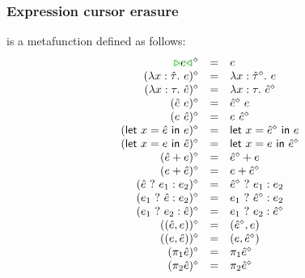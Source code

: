 \documentclass[formalism.tex]{subfiles}
\begin{document}
\subsubsection{Expression cursor erasure}
\judgbox{\ensuremath{\cursorErase{\ZMV}}} is a metafunction defined as follows:
%
\[\begin{array}{rcl}
  \cursorErasesToRow{\ZCursor{\EMV}}{\EMV} \\
  \cursorErasesToRow{(\ZLamT{x}{\ZTMV}{\EMV})}{\ELam{x}{\cursorErase{\ZTMV}}{\EMV}} \\
  \cursorErasesToRow{(\ZLamE{x}{\TMV}{\ZMV})}{\ELam{x}{\TMV}{\cursorErase{\ZMV}}} \\
  \cursorErasesToRow{(\ZApL{\ZMV}{\EMV})}{\EAp{\cursorErase{\ZMV}}{\EMV}} \\
  \cursorErasesToRow{(\ZApR{\EMV}{\ZMV})}{\EAp{\EMV}{\cursorErase{\ZMV}}} \\
  \cursorErasesToRow{(\ZLetL{x}{\ZMV}{\EMV})}{\ELet{x}{\cursorErase{\ZMV}}{\EMV}} \\
  \cursorErasesToRow{(\ZLetR{x}{\EMV}{\ZMV})}{\ELet{x}{\EMV}{\cursorErase{\ZMV}}} \\
  \cursorErasesToRow{(\ZPlusL{\ZMV}{\EMV})}{\EPlus{\cursorErase{\ZMV}}{\EMV}} \\
  \cursorErasesToRow{(\ZPlusR{\EMV}{\ZMV})}{\EPlus{\EMV}{\cursorErase{\ZMV}}} \\
  \cursorErasesToRow{(\ZIfC{\ZMV}{\EMV_1}{\EMV_2})}{\EIf{\cursorErase{\ZMV}}{\EMV_1}{\EMV_2}} \\
  \cursorErasesToRow{(\ZIfL{\EMV_1}{\ZMV}{\EMV_2})}{\EIf{\EMV_1}{\cursorErase{\ZMV}}{\EMV_2}} \\
  \cursorErasesToRow{(\ZIfL{\EMV_1}{\EMV_2}{\ZMV})}{\EIf{\EMV_1}{\EMV_2}{\cursorErase{\ZMV}}} \\
  \cursorErasesToRow{(\ZPairL{\ZMV}{\EMV})}{\EPair{\cursorErase{\ZMV}}{\EMV}} \\
  \cursorErasesToRow{(\ZPairR{\EMV}{\ZMV})}{\EPair{\EMV}{\cursorErase{\ZMV}}} \\
  \cursorErasesToRow{(\ZProjL{\ZMV})}{\EProjL{\cursorErase{\ZMV}}} \\
  \cursorErasesToRow{(\ZProjR{\ZMV})}{\EProjR{\cursorErase{\ZMV}}} \\
\end{array}\]
\end{document}
